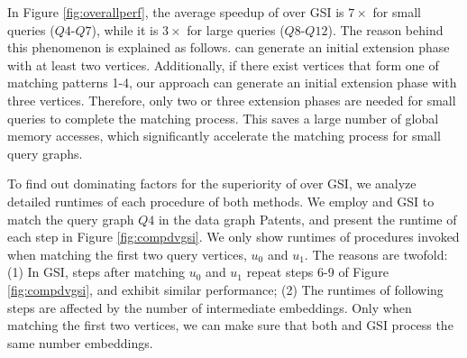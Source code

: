 In Figure \ref{fig:overallperf}, the average speedup of \SystemName over GSI is $7\times$ for small queries ($Q4$-$Q7$), while it is $3\times$ for large queries ($Q8$-$Q12$). The reason behind this phenomenon is explained as follows. \SystemName can generate an initial extension phase with at least two vertices. Additionally, if there exist vertices that form one of matching patterns 1-4, our approach can generate an initial extension phase with three vertices. Therefore, only two or three extension phases are needed for small queries to complete the matching process. This saves a large number of global memory accesses, which significantly accelerate the matching process for small query graphs.

To find out dominating factors for the superiority of \SystemName over GSI, we analyze detailed runtimes of each procedure of both methods. We employ \SystemName and GSI to match the query graph $Q4$ in the data graph Patents, and present the runtime of each step in Figure \ref{fig:compdvgsi}. We only show runtimes of procedures invoked when matching the first two query vertices, $u_0$ and $u_1$. The reasons are twofold: (1) In GSI, steps after matching $u_0$ and $u_1$ repeat steps 6-9 of Figure \ref{fig:compdvgsi}, and exhibit similar performance; (2) The runtimes of following steps are affected by the number of intermediate embeddings. Only when matching the first two vertices, we can make sure that both \SystemName and GSI process the same number embeddings.

